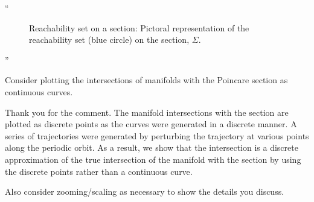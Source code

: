 \documentclass[11pt]{article}
\newenvironment{correction}{\begin{list}{}{\setlength{\leftmargin}{1cm}\setlength{\rightmargin}{1cm}}\vspace{\parsep}\item[]``}{''\end{list}}
\begin{document}
\begin{enumerate}
\begin{correction}
\begin{figure}[H]
\begin{scaletikzpicturetowidth}{0.3\textwidth}
        \end{scaletikzpicturetowidth}
        \caption{Reachability set on a \Poincare section: Pictoral representation of the reachability set (blue circle) on the \Poincare section, \(\Sigma\). 
        }
\end{figure}
\end{correction}

\item
    \begin{itshape}
Consider plotting the intersections of manifolds with the Poincare section as continuous curves.  
\end{itshape}

Thank you for the comment.
The manifold intersections with the \Poincare section are plotted as discrete points as the curves were generated in a discrete manner. 
A series of trajectories were generated by perturbing the trajectory at various points along the periodic orbit. 
As a result, we show that the intersection is a discrete approximation of the true intersection of the manifold with the section by using the discrete points rather than a continuous curve. 

\item
    \begin{itshape}
Also consider zooming/scaling as necessary to show the details you discuss.
\end{itshape}


\end{enumerate}
\end{document}
